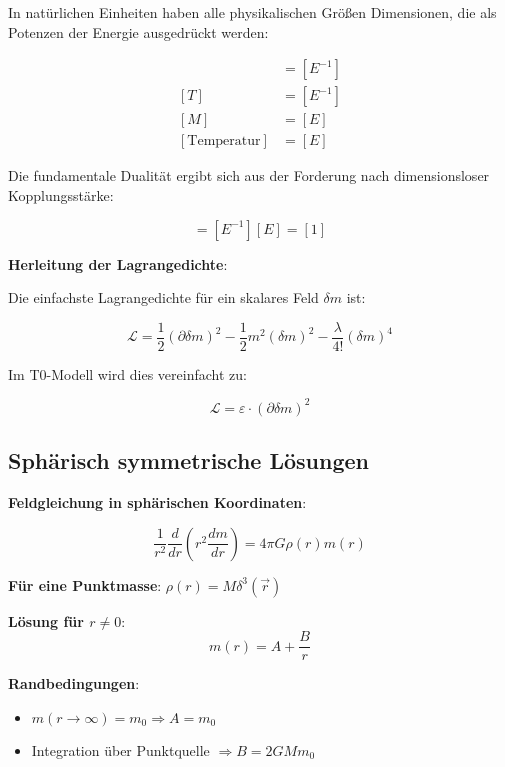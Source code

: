\documentclass[12pt,a4paper]{report}
\begin{document}
	In natürlichen Einheiten haben alle physikalischen Größen Dimensionen, die als Potenzen der Energie ausgedrückt werden:
	
	\begin{align}
		[L] &= [E^{-1}] \\
		[T] &= [E^{-1}] \\
		[M] &= [E] \\
		[\text{Temperatur}] &= [E]
	\end{align}
	
	Die fundamentale Dualität ergibt sich aus der Forderung nach dimensionsloser Kopplungsstärke:
	
	\begin{equation}
		[T][M] = [E^{-1}][E] = [1]
	\end{equation}
	
	\textbf{Herleitung der Lagrangedichte}:
	
	Die einfachste Lagrangedichte für ein skalares Feld $\delta m$ ist:
	
	\begin{equation}
		\mathcal{L} = \frac{1}{2}(\partial\delta m)^2 - \frac{1}{2}m^2(\delta m)^2 - \frac{\lambda}{4!}(\delta m)^4
	\end{equation}
	
	Im T0-Modell wird dies vereinfacht zu:
	
	\begin{equation}
		\mathcal{L} = \varepsilon \cdot (\partial\delta m)^2
	\end{equation}
	
	\subsection{Sphärisch symmetrische Lösungen}
	
	\textbf{Feldgleichung in sphärischen Koordinaten}:
	
	\begin{equation}
		\frac{1}{r^2}\frac{d}{dr}\left(r^2\frac{dm}{dr}\right) = 4\pi G \rho(r) m(r)
	\end{equation}
	
	\textbf{Für eine Punktmasse}: $\rho(r) = M\delta^3(\vec{r})$
	
	\textbf{Lösung für $r \neq 0$}:
	\begin{equation}
		m(r) = A + \frac{B}{r}
	\end{equation}
	
	\textbf{Randbedingungen}:
	\begin{itemize}
		\item $m(r \to \infty) = m_0 \Rightarrow A = m_0$
		\item Integration über Punktquelle $\Rightarrow B = 2GMm_0$
	\end{itemize}
	
\end{document}
